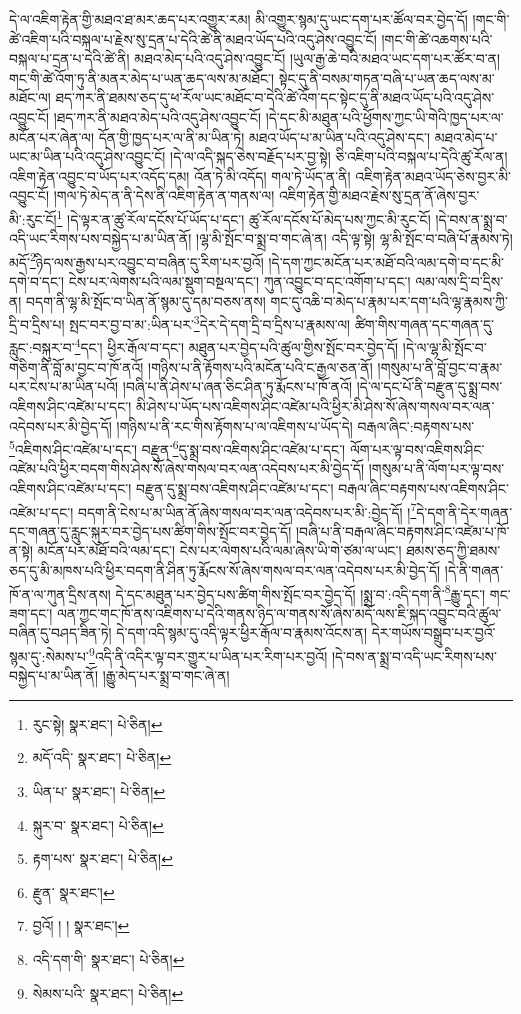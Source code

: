 དེ་ལ་འཇིག་རྟེན་གྱི་མཐའ་ཐ་མར་ཆད་པར་འགྱུར་རམ། མི་འགྱུར་སྙམ་དུ་ཡང་དག་པར་ཚོལ་བར་བྱེད་དོ། །གང་གི་ཚེ་འཇིག་པའི་བསྐལ་པ་རྗེས་སུ་དྲན་པ་དེའི་ཚེ་ནི་མཐའ་ཡོད་པའི་འདུ་ཤེས་འབྱུང་ངོ། །གང་གི་ཚེ་འཆགས་པའི་བསྐལ་པ་དྲན་པ་དེའི་ཚེ་ནི། མཐའ་མེད་པའི་འདུ་ཤེས་འབྱུང་ངོ། །ཡུལ་རྒྱ་ཆེ་བའི་མཐའ་ཡང་དག་པར་ཚོར་བ་ན། གང་གི་ཚེ་འོག་ཏུ་ནི་མནར་མེད་པ་ཡན་ཆད་ལས་མ་མཐོང་། སྟེང་དུ་ནི་བསམ་གཏན་བཞི་པ་ཡན་ཆད་ལས་མ་མཐོང་ལ། ཐད་ཀར་ནི་ཐམས་ཅད་དུ་ཕ་རོལ་ཡང་མཐོང་བ་དེའི་ཚེ་འོག་དང་སྟེང་དུ་ནི་མཐའ་ཡོད་པའི་འདུ་ཤེས་འབྱུང་ངོ། །ཐད་ཀར་ནི་མཐའ་མེད་པའི་འདུ་ཤེས་འབྱུང་ངོ། །དེ་དང་མི་མཐུན་པའི་ཕྱོགས་ཀྱང་ཡི་གེའི་ཁྱད་པར་ལ་མངོན་པར་ཞེན་ལ། དོན་གྱི་ཁྱད་པར་ལ་ནི་མ་ཡིན་ཏེ། མཐའ་ཡོད་པ་མ་ཡིན་པའི་འདུ་ཤེས་དང་། མཐའ་མེད་པ་ཡང་མ་ཡིན་པའི་འདུ་ཤེས་འབྱུང་ངོ། །དེ་ལ་འདི་སྐད་ཅེས་བརྗོད་པར་བྱ་སྟེ། ཅི་འཇིག་པའི་བསྐལ་པ་དེའི་ཚུ་རོལ་ན། འཇིག་རྟེན་འབྱུང་བ་ཡོད་པར་འདོད་དམ། འོན་ཏེ་མི་འདོད། གལ་ཏེ་ཡོད་ན་ནི། འཇིག་རྟེན་མཐའ་ཡོད་ཅེས་བྱར་མི་འབྱུང་ངོ། །གལ་ཏེ་མེད་ན་ནི་དེས་ནི་འཇིག་རྟེན་ན་གནས་ལ། འཇིག་རྟེན་གྱི་མཐའ་རྗེས་སུ་དྲན་ནོ་ཞེས་བྱར་མི་:རུང་ངོ།\footnote{རུང་སྟེ།  སྣར་ཐང་།  པེ་ཅིན། } །དེ་ལྟར་ན་ཚུ་རོལ་དངོས་པོ་ཡོད་པ་དང་། ཚུ་རོལ་དངོས་པོ་མེད་པས་ཀྱང་མི་རུང་ངོ། །དེ་བས་ན་སྨྲ་བ་འདི་ཡང་རིགས་པས་བསྐྱེད་པ་མ་ཡིན་ནོ། །ལྷ་མི་སྤོང་བ་སྨྲ་བ་གང་ཞེ་ན། འདི་ལྟ་སྟེ། ལྷ་མི་སྤོང་བ་བཞི་པོ་རྣམས་ཏེ། མདོ་\footnote{མདོ་འདི་  སྣར་ཐང་།  པེ་ཅིན། }ཉིད་ལས་རྒྱས་པར་འབྱུང་བ་བཞིན་དུ་རིག་པར་བྱའོ། །དེ་དག་ཀྱང་མངོན་པར་མཐོ་བའི་ལམ་དགེ་བ་དང་མི་དགེ་བ་དང་། ངེས་པར་ལེགས་པའི་ལམ་སྡུག་བསྔལ་དང་། ཀུན་འབྱུང་བ་དང་འགོག་པ་དང་། ལམ་ལས་དྲི་བ་དྲིས་ན། བདག་ནི་ལྷ་མི་སྤོང་བ་ཡིན་ནོ་སྙམ་དུ་དམ་བཅས་ནས། གང་དུ་འཆི་བ་མེད་པ་རྣམ་པར་དག་པའི་ལྷ་རྣམས་ཀྱི་དྲི་བ་དྲིས་པ། སྤང་བར་བྱ་བ་མ་:ཡིན་པར་\footnote{ཡིན་པ་  སྣར་ཐང་།  པེ་ཅིན། }དེར་དེ་དག་དྲི་བ་དྲིས་པ་རྣམས་ལ། ཚིག་གིས་གཞན་དང་གཞན་དུ་རླུང་:བསྐུར་བ་\footnote{སྐུར་བ་  སྣར་ཐང་།  པེ་ཅིན། }དང་། ཕྱིར་རྒོལ་བ་དང་། མཐུན་པར་བྱེད་པའི་ཚུལ་གྱིས་སྤོང་བར་བྱེད་དོ། །དེ་ལ་ལྷ་མི་སྤོང་བ་གཅིག་ནི་བློ་མ་བྱང་བ་ཁོ་ནའོ། །གཉིས་པ་ནི་རྟོགས་པའི་མངོན་པའི་ང་རྒྱལ་ཅན་ནོ། །གསུམ་པ་ནི་བློ་བྱང་བ་རྣམ་པར་ངེས་པ་མ་ཡིན་པའོ། །བཞི་པ་ནི་ཤེས་པ་ཞན་ཅིང་ཤིན་ཏུ་རྨོངས་པ་ཁོ་ནའོ། །དེ་ལ་དང་པོ་ནི་བརྫུན་དུ་སྨྲ་བས་འཇིགས་ཤིང་འཛེམ་པ་དང་། མི་ཤེས་པ་ཡོད་པས་འཇིགས་ཤིང་འཛེམ་པའི་ཕྱིར་མི་ཤེས་སོ་ཞེས་གསལ་བར་ལན་འདེབས་པར་མི་བྱེད་དོ། །གཉིས་པ་ནི་རང་གིས་རྟོགས་པ་ལ་འཇིགས་པ་ཡོད་དེ། བརྒལ་ཞིང་:བརྟགས་པས་\footnote{རྟག་པས་  སྣར་ཐང་།  པེ་ཅིན། }འཇིགས་ཤིང་འཛེམ་པ་དང་། བརྫུན་\footnote{རྫུན་  སྣར་ཐང་། }དུ་སྨྲ་བས་འཇིགས་ཤིང་འཛེམ་པ་དང་། ལོག་པར་ལྟ་བས་འཇིགས་ཤིང་འཛེམ་པའི་ཕྱིར་བདག་གིས་ཤེས་སོ་ཞེས་གསལ་བར་ལན་འདེབས་པར་མི་བྱེད་དོ། །གསུམ་པ་ནི་ལོག་པར་ལྟ་བས་འཇིགས་ཤིང་འཛེམ་པ་དང་། བརྫུན་དུ་སྨྲ་བས་འཇིགས་ཤིང་འཛེམ་པ་དང་། བརྒལ་ཞིང་བརྟགས་པས་འཇིགས་ཤིང་འཛེམ་པ་དང་། བདག་ནི་ངེས་པ་མ་ཡིན་ནོ་ཞེས་གསལ་བར་ལན་འདེབས་པར་མི་:བྱེད་དོ། །\footnote{བྱའོ། ། །  སྣར་ཐང་། }དེ་དག་ནི་དེར་གཞན་དང་གཞན་དུ་རླུང་སྐུར་བར་བྱེད་པས་ཚིག་གིས་སྤོང་བར་བྱེད་དོ། །བཞི་པ་ནི་བརྒལ་ཞིང་བརྟགས་ཤིང་འཛེམ་པ་ཁོ་ན་སྟེ། མངོན་པར་མཐོ་བའི་ལམ་དང་། ངེས་པར་ལེགས་པའི་ལམ་ཞེས་ཡི་གེ་ཙམ་ལ་ཡང་། ཐམས་ཅད་ཀྱི་ཐམས་ཅད་དུ་མི་མཁས་པའི་ཕྱིར་བདག་ནི་ཤིན་ཏུ་རྨོངས་སོ་ཞེས་གསལ་བར་ལན་འདེབས་པར་མི་བྱེད་དོ། །དེ་ནི་གཞན་ཁོ་ན་ལ་ཀུན་དྲིས་ནས། དེ་དང་མཐུན་པར་བྱེད་པས་ཚིག་གིས་སྤོང་བར་བྱེད་དོ། །སྨྲ་བ་:འདི་དག་ནི་\footnote{འདི་དག་གི་  སྣར་ཐང་།  པེ་ཅིན། }རྒྱུ་དང་། གང་ཟག་དང་། ལན་ཀྱང་གང་ཁོ་ནས་འཇིགས་པ་དེའི་གནས་ཉིད་ལ་གནས་སོ་ཞེས་མདོ་ལས་ཇི་སྐད་འབྱུང་བའི་ཚུལ་བཞིན་དུ་བཤད་ཟིན་ཏེ། དེ་དག་འདི་སྙམ་དུ་འདི་ལྟར་ཕྱིར་རྒོལ་བ་རྣམས་འོངས་ན། དེར་གཡོས་བསྒྲུབ་པར་བྱའོ་སྙམ་དུ་:སེམས་པ་\footnote{སེམས་པའི་  སྣར་ཐང་།  པེ་ཅིན། }འདི་ནི་འདིར་ལྟ་བར་གྱུར་པ་ཡིན་པར་རིག་པར་བྱའོ། །དེ་བས་ན་སྨྲ་བ་འདི་ཡང་རིགས་པས་བསྐྱེད་པ་མ་ཡིན་ནོ། །རྒྱུ་མེད་པར་སྨྲ་བ་གང་ཞེ་ན། 